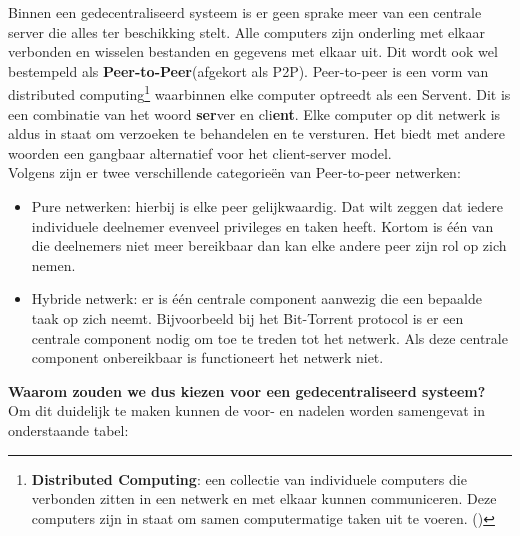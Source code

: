 Binnen een gedecentraliseerd systeem is er geen sprake meer van een centrale server die alles ter beschikking stelt. Alle computers zijn onderling met elkaar verbonden en wisselen bestanden en gegevens met elkaar uit. Dit wordt ook wel bestempeld als \textbf{Peer-to-Peer}(afgekort als P2P). Peer-to-peer is een vorm van distributed computing\footnote{\textbf{Distributed Computing}: een collectie van individuele computers die verbonden zitten in een netwerk en met elkaar kunnen communiceren. Deze computers zijn in staat om samen computermatige taken uit te voeren. (\autocite{Attiya2004})} waarbinnen elke computer optreedt als een Servent. Dit is een combinatie van het woord \textbf{ser}ver en cli\textbf{ent}. Elke computer op dit netwerk is aldus in staat om verzoeken te behandelen en te versturen. Het biedt met andere woorden een gangbaar alternatief voor het client-server model. \\
 
Volgens \textcite{Schollmeier2001} zijn er  twee verschillende categorieën van Peer-to-peer netwerken:

\begin{itemize}
\item Pure netwerken: hierbij is elke peer gelijkwaardig. Dat wilt zeggen dat iedere individuele deelnemer evenveel privileges en taken heeft. Kortom is één van die deelnemers niet meer bereikbaar dan kan elke andere peer zijn rol op zich nemen.\\
\item Hybride netwerk: er is één centrale component aanwezig die een bepaalde taak op zich neemt. Bijvoorbeeld bij het Bit-Torrent protocol is er een centrale component nodig om toe te treden tot het netwerk. Als deze centrale component onbereikbaar is functioneert het netwerk niet.\\
\end{itemize}


\textbf{Waarom zouden we dus kiezen voor een gedecentraliseerd systeem?} Om dit duidelijk te maken kunnen de voor- en nadelen worden samengevat in onderstaande tabel:\\

